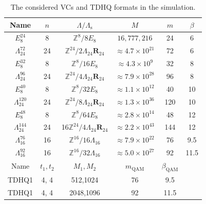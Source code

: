 \documentclass[journal]{IEEEtran}
\newcommand{\Z}{\mathbb{Z}}
\newcommand{\bR}{\boldsymbol{R}}
\newcommand{\Lambdas}{\Lambda_\mathrm{s}}
\begin{document}
\begin{table}[tbp]
  \renewcommand{\arraystretch}{1.4}
  \renewcommand{\tabcolsep}{3.2pt}
  \caption{The considered VCs and TDHQ formats in the simulation.}
  \label{tab:VCs}
  \centering
  \begin{tabular}{c c c c c c}
    \hline 
    Name &$n$& $\Lambda/\Lambdas$ &  $M$  & $m$ & $\beta$ \\
    \hline \hline
    $E_8^{24}$ &8& $\Z^8/8E_8$ & $16,777,216$& 24 &6\\
    $\Lambda_{24}^{72}$ &24 &$\Z^{24}/2\Lambda_{24}\bR_{24}$ & $\approx4.7\times10^{21}$& 72 &6\\
    $E_8^{32}$ &8& $\Z^8/16E_8$ & $\approx4.3\times10^{9}$& 32 &8\\
    $\Lambda_{24}^{96}$ &24& $\Z^{24}/4\Lambda_{24}\bR_{24}$ & $\approx7.9\times10^{28}$& 96 &8\\
    $E_8^{40}$ &8& $\Z^8/32E_8$ & $\approx1.1\times10^{12}$& 40 &10\\
    $\Lambda_{24}^{120}$ &24& $\Z^{24}/8\Lambda_{24}\bR_{24}$ & $\approx1.3\times10^{36}$& 120 &10\\
    $E_8^{48}$ &8& $\Z^8/64E_8$ & $\approx2.8\times10^{14}$& 48 &12\\
    $\Lambda_{24}^{144}$ &24& 16$\Z^{24}/4\Lambda_{24}\bR_{24}$ & $\approx2.2\times10^{43}$& 144 &12\\
    $\Lambda_{16}^{76}$ &16& $\Z^{16}/16\Lambda_{16}$ & $\approx7.9\times10^{22}$ & 76 &9.5\\
    $\Lambda_{16}^{92}$ &16& $\Z^{16}/32\Lambda_{16}$ & $\approx5.0\times 10^{27}$ & 92 &11.5\\
    \hline
    Name &  $t_1,t_2$ &$M_1,M_2$  & 
    $m_{\text{QAM}}$ & $\beta_{\text{QAM}}$ \\
    \hline \hline
    TDHQ1 & 4, 4 &512,1024 &76 & 9.5\\
    TDHQ1 & 4, 4 &2048,1096 &92 & 11.5\\
    \hline
  \end{tabular}
\end{table}
\end{document}
